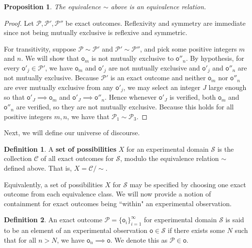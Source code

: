 \documentclass[review]{elsarticle}
\theoremstyle{plain}%
\newtheorem{prop}[thm]{Proposition}
\theoremstyle{definition}
\newtheorem{defn}{Definition}[section]
\theoremstyle{remark}
\begin{document}
\begin{prop}
The equivalence $\sim$ above is an equivalence relation.
\end{prop}
\begin{proof}
Let $\mathcal{P},\mathcal{P}',\mathcal{P}''$ be exact outcomes. Reflexivity and symmetry are immediate since not being mutually exclusive is reflexive and symmetric. 

For transitivity, suppose $\mathcal{P}\sim\mathcal{P}'$ and $\mathcal{P}'\sim\mathcal{P}''$, and pick some positive integers $m$ and $n$. We will show that $\mathsf{o}_m$ is not mutually exclusive to $\mathsf{o}''_n$. By hypothesis, for every $\mathsf{o}'_j\in\mathcal{P}'$, we have $\mathsf{o}_m$ and $\mathsf{o}'_j$ are not mutually exclusive and $\mathsf{o}'_j$ and $\mathsf{o}''_n$ are not mutually exclusive. Because $\mathcal{P}'$ is an exact outcome and neither $\mathsf{o}_m$ nor $\mathsf{o}''_n$ are ever mutually exclusive from any $\mathsf{o}'_j$, we may select an integer $J$ large enough so that $\mathsf{o}'_J\implies\mathsf{o}_m$ and $\mathsf{o}'_J\implies\mathsf{o}''_n$. Hence whenever $\mathsf{o}'_J$ is verified, both $\mathsf{o}_m$ and $\mathsf{o}''_n$ are verified, so they are not mutually exclusive. Because this holds for all positive integers $m,n$, we have that $\mathcal{P}_1\sim\mathcal{P}_3$. 
\end{proof}

Next, we will define our universe of discourse. 


\begin{defn}
	A \textbf{set of possibilities} $X$ for an experimental domain $\mathcal{S}$ is the collection $\mathcal{C}$ of all exact outcomes for $\mathcal{S}$, modulo the equivalence relation $\sim$ defined above. That is, $X=\mathcal{C}/\sim$. 
\end{defn}

Equivalently, a set of possibilities $X$ for $\mathcal{S}$ may be specified by choosing one exact outcome from each equivalence class. We will now provide a notion of containment for exact outcomes being ``within" an experimental observation. 

\begin{defn}
An exact outcome $\mathcal{P}=\{\mathsf{o}_i\}_{i=1}^{\infty}$ for experimental domain $\mathcal{S}$ is said to be an element of an experimental observation $\mathsf{o}\in\mathcal{S}$ if there exists some $N$ such that for all $n>N$, we have $\mathsf{o}_n\implies\mathsf{o}$. We denote this as $\mathcal{P}\in\mathsf{o}$. 
\end{defn}
\end{document}

